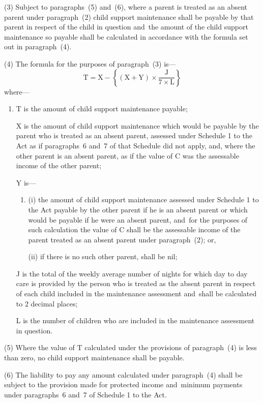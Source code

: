 \documentclass[12pt,a4paper]{article}
\begin{document}
(3) Subject to paragraphs~(5) and~(6), where a parent is treated as an absent parent under paragraph~(2) child support maintenance shall be payable by that parent in respect of the child in question and~the amount of the child support maintenance so payable shall be calculated in accordance with the formula set out in paragraph~(4).

(4) The formula for the purposes of paragraph~(3) is—
\[\mathrm{T} = \mathrm{X} - \left\{ (\mathrm{X}+\mathrm{Y}) \times \frac{\mathrm{J}}{7 \times \mathrm{L}} \right\}\]
where—
\begin{enumerate}\item[]
    T is the amount of child support maintenance payable;

    X is the amount of child support maintenance which would be payable by the parent who is treated as an absent parent, assessed under Schedule 1 to the Act as if paragraphs~6 and~7 of that Schedule did not apply, and, where the other parent is an absent parent, as if the value of C was the assessable income of the other parent;

    Y is—
\begin{enumerate}\item[]
    (i)
    the amount of child support maintenance assessed under Schedule 1 to the Act payable by the other parent if he is an absent parent or which would be payable if he were an absent parent, and~for the purposes of such calculation the value of C shall be the assessable income of the parent treated as an absent parent under paragraph~(2); or,

    (ii)
    if there is no such other parent, shall be nil;
\end{enumerate}

    J is the total of the weekly average number of nights for which day to day care is provided by the person who is treated as the absent parent in respect of each child included in the maintenance assessment and~shall be calculated to 2 decimal places;

    L is the number of children who are included in the maintenance assessment in question. 
\end{enumerate}

(5) Where the value of T calculated under the provisions of paragraph~(4) is less than zero, no child support maintenance shall be payable.

(6) The liability to pay any amount calculated under paragraph~(4) shall be subject to the provision made for protected income and~minimum payments under paragraphs~6 and~7 of Schedule 1 to the Act.
\end{document}
